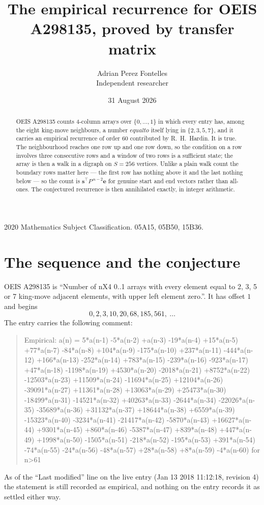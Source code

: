 \documentclass[11pt,a4paper]{article}
\title{The empirical recurrence for OEIS A298135, proved by transfer matrix}
\author{Adrian Perez Fontelles\\ \small Independent researcher}
\date{31 August 2026}
\theoremstyle{plain}
\theoremstyle{definition}
\begin{document}
\maketitle

\begin{abstract}
OEIS A298135 counts $4$-column arrays over $\{0,\dots,1\}$ in which every entry has,
among the eight king-move neighbours, a number $equal to$ itself lying in $\{2,3,5,7\}$, and it carries an empirical
recurrence of order $60$ contributed by R.~H.~Hardin. It is true. The neighbourhood
reaches one row up and one row down, so the condition on a row involves three consecutive
rows and a window of two rows is a sufficient state; the array is then a walk in a digraph
on $S=256$ vertices. Unlike a plain walk count the boundary rows matter here --- the first
row has nothing above it and the last nothing below --- so the count is
$\mathbf{s}^{\!\top}P^{\,n-2}\mathbf{e}$ for genuine start and end vectors rather than
all-ones. The conjectured recurrence is then annihilated exactly, in integer arithmetic.
\end{abstract}

\noindent\small 2020 Mathematics Subject Classification. 05A15, 05B50, 15B36.\normalsize

\section{The sequence and the conjecture}

OEIS A298135 is ``Number of nX4 0..1 arrays with every element equal to 2, 3, 5 or 7 king-move adjacent elements, with upper left element zero.''. It has offset
$1$ and begins
\[
0, 2, 3, 10, 20, 68, 185, 561,\ \dots
\]
The entry carries the following comment:
\begin{quote}\small
Empirical: a(n) = 5*a(n-1) -5*a(n-2) +a(n-3) -19*a(n-4) +15*a(n-5) +77*a(n-7) -84*a(n-8) +104*a(n-9) -175*a(n-10) +237*a(n-11) -444*a(n-12) +166*a(n-13) -252*a(n-14) +783*a(n-15) -239*a(n-16) -923*a(n-17) +47*a(n-18) -1198*a(n-19) +4530*a(n-20) -2018*a(n-21) +8752*a(n-22) -12503*a(n-23) +11509*a(n-24) -11694*a(n-25) +12104*a(n-26) -39091*a(n-27) +11361*a(n-28) +13063*a(n-29) +25473*a(n-30) -18499*a(n-31) -14521*a(n-32) +40263*a(n-33) -2644*a(n-34) -22026*a(n-35) -35689*a(n-36) +31132*a(n-37) +18644*a(n-38) +6559*a(n-39) -15323*a(n-40) -3234*a(n-41) -21417*a(n-42) -5870*a(n-43) +16627*a(n-44) +9301*a(n-45) +860*a(n-46) -5387*a(n-47) +839*a(n-48) +447*a(n-49) +1998*a(n-50) -1505*a(n-51) -218*a(n-52) -195*a(n-53) +391*a(n-54) -74*a(n-55) -24*a(n-56) -48*a(n-57) +28*a(n-58) +8*a(n-59) -4*a(n-60) for n>61
\end{quote}
As of the ``Last modified'' line on the live entry (Jan 13 2018 11:12:18, revision
4) the statement is still recorded as empirical, and nothing on the entry
records it as settled either way.
\end{document}
